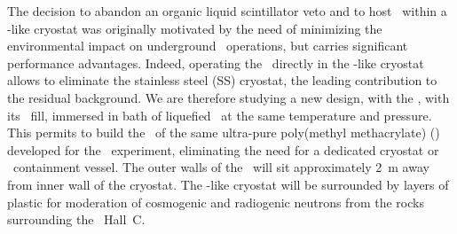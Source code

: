 The decision to abandon an organic liquid scintillator veto and to host \DSks\ within a \pDUNE-like cryostat was originally motivated by the need of minimizing the environmental impact on underground \LNGS\ operations, but carries significant performance advantages.  Indeed, operating the \TPC\ directly in the  \pDUNE-like cryostat  allows to eliminate the stainless steel (SS) cryostat, the leading contribution to the residual background. We are therefore studying  a new design, with the \TPC, with its \UAr\ fill,  immersed in bath of liquefied \AAr\ at the same temperature and pressure.  This permits to build the \TPC\ of the same ultra-pure poly(methyl methacrylate) (\PMMA) developed for the \DEAP\ experiment, eliminating the need for a dedicated cryostat or \UAr\ containment vessel.  The outer walls of the \TPC\ will sit approximately \SI{2}{\m} away from inner wall of the cryostat.  The \pDUNE-like cryostat will be surrounded by layers of plastic for moderation of cosmogenic and radiogenic neutrons from the rocks surrounding the \LNGS\ Hall~C.